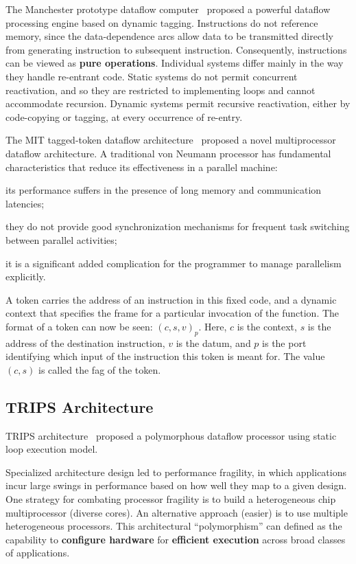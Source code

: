 \documentclass[UTF8,12pt,a4paper]{article}
\begin{document}
The Manchester prototype dataflow computer~\cite{DBLP:journals/cacm/GurdKW85} proposed
a powerful dataflow processing engine based on dynamic tagging.
Instructions do not reference memory, since the data-dependence arcs
allow data to be transmitted directly from generating instruction to subsequent instruction.
Consequently, instructions can be viewed as \textbf{pure operations}.
Individual systems differ mainly in the way they handle re-entrant code.
Static systems do not permit concurrent reactivation,
and so they are restricted to implementing loops and cannot accommodate recursion.
Dynamic systems permit recursive reactivation,
either by code-copying or tagging, at every occurrence of re-entry.

The MIT tagged-token dataflow architecture~\cite{DBLP:journals/tc/ArvindN90} proposed
a novel multiprocessor dataflow architecture.
A traditional von Neumann processor has fundamental characteristics
that reduce its effectiveness in a parallel machine:
\begin{compactitem}
  \item its performance suffers in the presence of long memory and communication latencies;
  \item they do not provide good synchronization mechanisms
        for frequent task switching between parallel activities;
  \item it is a significant added complication for the programmer to manage parallelism explicitly.
\end{compactitem}
A token carries the address of an instruction in this fixed code,
and a dynamic context that specifies the frame for a particular invocation of the function.
The format of a token can now be seen: $(c, s, v)_p$.
Here, $c$ is the context, $s$ is the address of the destination instruction, $v$ is the datum,
and $p$ is the port identifying which input of the instruction this token is meant for.
The value $(c, s)$ is called the fag of the token.

\subsection{TRIPS Architecture}

TRIPS architecture~\cite{DBLP:conf/isca/SankaralingamNLKHBKM03} proposed 
a polymorphous dataflow processor using static loop execution model.

Specialized architecture design led to performance fragility,
in which applications incur large swings in performance
based on how well they map to a given design.
One strategy for combating processor fragility is to build a heterogeneous chip multiprocessor (diverse cores).
An alternative approach (easier) is to use multiple heterogeneous processors.
This architectural ``polymorphism'' can defined as the capability to \textbf{configure hardware}
for \textbf{efficient execution} across broad classes of applications.
\end{document}
